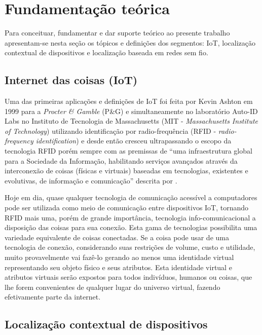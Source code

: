 \chapter{Fundamentação teórica}
\label{chap:Fundamentação teorica}


Para conceituar, fundamentar e dar suporte teórico ao presente trabalho
apresentam-se nesta seção os tópicos e definições dos segmentos: IoT,
localização contextual de dispositivos e localização baseada em redes sem fio.

\section{Internet das coisas (IoT)}
\label{sec:INTERNET DAS COISAS (IOT)}

Uma das primeiras aplicações e definições de IoT foi feita por Kevin Ashton em
1999 para a \textit{Procter \& Gamble} (P\&G) \cite{ASHTON2009} e
simultaneamente no laboratório Auto-ID Labs no Instituto de Tecnologia de
Massachusetts (MIT - \textit{Massachusetts Institute of Technology}) utilizando
identificação por radio-frequência (RFID - \textit{radio-frequency
identification}) \cite{ATZORI2010, Friedemann2011} e desde então cresceu
ultrapassando o escopo da tecnologia RFID porém sempre com as premissas de ``uma
infraestrutura global para a Sociedade da Informação, habilitando serviços
avançados através da interconexão de coisas (físicas e virtuais) baseadas em
tecnologias, existentes e evolutivas, de informação e comunicação'' descrita por
.

Hoje em dia, quase qualquer tecnologia de comunicação acessível a computadores
pode ser utilizada como meio de comunicação entre dispositivos IoT, tornando
RFID mais uma, porém de grande importância, tecnologia info-comunicacional a
disposição das coisas para sua conexão. Esta gama de tecnologias possibilita uma
variedade equivalente de coisas conectadas. Se a coisa pode usar de uma
tecnologia de conexão, considerando suas restrições de volume, custo e
utilidade, muito provavelmente vai fazê-lo gerando ao menos uma identidade
virtual representando seu objeto físico e seus atributos. Esta identidade
virtual e atributos virtuais serão expostos para todos indivíduos, humanos ou
coisas, que lhe forem convenientes de qualquer lugar do universo virtual,
fazendo efetivamente parte da internet.

\section{Localização contextual de dispositivos}
\label{sec:Localização contextual de dispositivos}


